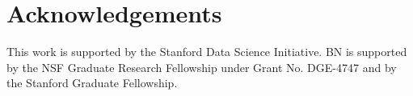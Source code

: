 \section{Acknowledgements} %
\label{sec:acknowledgements}

This work is supported by the Stanford Data Science Initiative. BN is supported by the NSF Graduate Research Fellowship under Grant No. DGE-4747 and by the Stanford Graduate Fellowship.  

